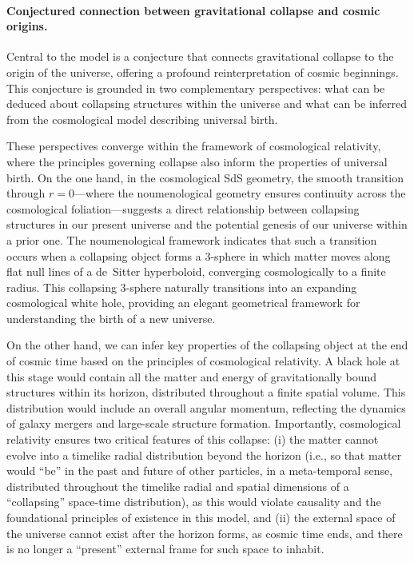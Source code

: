 \documentclass[aps,rmp,groupedaddress,twocolumn,10pt]{revtex4-2}
\begin{document}
\paragraph{Conjectured connection between gravitational collapse and cosmic origins.}
Central to the model is a conjecture that connects gravitational collapse to the origin of the universe, offering a profound reinterpretation of cosmic beginnings. This conjecture is grounded in two complementary perspectives: what can be deduced about collapsing structures within the universe and what can be inferred from the cosmological model describing universal birth.

These perspectives converge within the framework of cosmological relativity, where the principles governing collapse also inform the properties of universal birth. On the one hand, in the cosmological SdS geometry, the smooth transition through $r=0$---where the noumenological geometry ensures continuity across the cosmological foliation---suggests a direct relationship between collapsing structures in our present universe and the potential genesis of our universe within a prior one. The noumenological framework indicates that such a transition occurs when a collapsing object forms a 3-sphere in which matter moves along flat null lines of a de~Sitter hyperboloid, converging cosmologically to a finite radius. This collapsing 3-sphere naturally transitions into an expanding cosmological white hole, providing an elegant geometrical framework for understanding the birth of a new universe.

On the other hand, we can infer key properties of the collapsing object at the end of cosmic time based on the principles of cosmological relativity. A black hole at this stage would contain all the matter and energy of gravitationally bound structures within its horizon, distributed throughout a finite spatial volume. This distribution would include an overall angular momentum, reflecting the dynamics of galaxy mergers and large-scale structure formation. Importantly, cosmological relativity ensures two critical features of this collapse: (i) the matter cannot evolve into a timelike radial distribution beyond the horizon (i.e., so that matter would ``be'' in the past and future of other particles, in a meta-temporal sense, distributed throughout the timelike radial and spatial dimensions of a ``collapsing'' space-time distribution), as this would violate causality and the foundational principles of existence in this model, and (ii) the external space of the universe cannot exist after the horizon forms, as cosmic time ends, and there is no longer a ``present'' external frame for such space to inhabit.
\end{document}
